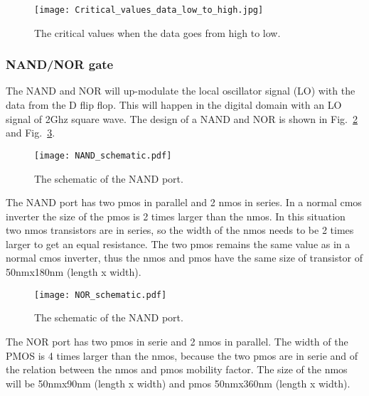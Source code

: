\begin{figure}[h]
\texttt{[image: Critical\_values\_data\_low\_to\_high.jpg]}
\caption{The critical values when the data goes from high to low.}
\label{fig:Critical_values_data_low_to_high_figure}
\end{figure}

\subsubsection{NAND/NOR gate}\label{sec:frontend}
The NAND and NOR will up-modulate the local oscillator signal (LO) with the data from the D flip flop. This will happen in the digital domain with an LO signal of 2Ghz square wave.
The design of a NAND and NOR is shown in Fig.~\ref{fig:NAND_schematic_figure} and Fig.~\ref{fig:NOR_schematic_figure}.

\begin{figure}[htp]
\texttt{[image: NAND\_schematic.pdf]}
\caption{The schematic of the NAND port.}
\label{fig:NAND_schematic_figure}
\end{figure}

The NAND port has two pmos in parallel and 2 nmos in series. In a normal cmos inverter the size of the pmos is 2 times larger than the nmos. In this situation two nmos transistors are in series, so the width of the nmos needs to be 2 times larger to get an equal resistance. The two pmos remains the same value as in a normal cmos inverter, thus the nmos and pmos have the same size of transistor of 50nmx180nm (length x width).

\begin{figure}[htp]
\texttt{[image: NOR\_schematic.pdf]}
\caption{The schematic of the NAND port.}
\label{fig:NOR_schematic_figure}
\end{figure}

The NOR port has two pmos in serie and 2 nmos in parallel. The width of the PMOS is 4 times larger than the nmos, because the two pmos are in serie and of the relation between the nmos and pmos mobility factor. The size of the nmos will be 50nmx90nm (length x width) and pmos 50nmx360nm (length x width).
